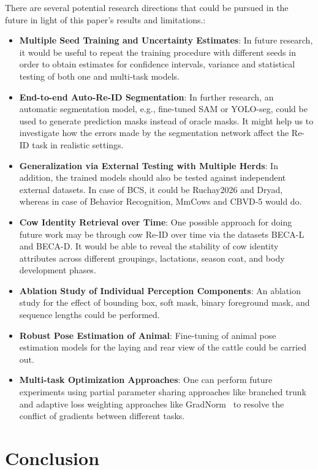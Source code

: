 There are several potential research directions that could be pursued in the future in light of this paper's results and limitations.:
\begin{itemize}
    \item \textbf{Multiple Seed Training and Uncertainty Estimates}: In future research, it would be useful to repeat the training procedure with different seeds in order to obtain estimates for confidence intervals, variance and statistical testing of both one and multi-task models.
    \item \textbf{End-to-end Auto-Re-ID Segmentation}: In further research, an automatic segmentation model, e.g., fine-tuned SAM or YOLO-seg, could be used to generate prediction masks instead of oracle masks. It might help us to investigate how the errors made by the segmentation network affect the Re-ID task in realistic settings.
    \item \textbf{Generalization via External Testing with Multiple Herds}: In addition, the trained models should also be tested against independent external datasets. In case of BCS, it could be Ruchay2026 and Dryad, whereas in case of Behavior Recognition, MmCows and CBVD-5 would do.
    \item \textbf{Cow Identity Retrieval over Time}: One possible approach for doing future work may be through cow Re-ID over time via the datasets BECA-L and BECA-D. It would be able to reveal the stability of cow identity attributes across different groupings, lactations, season coat, and body development phases.
    \item \textbf{Ablation Study of Individual Perception Components}: An ablation study for the effect of bounding box, soft mask, binary foreground mask, and sequence lengths could be performed.
    \item \textbf{Robust Pose Estimation of Animal}: Fine-tuning of animal pose estimation models for the laying and rear view of the cattle could be carried out.
    \item \textbf{Multi-task Optimization Approaches}: One can perform future experiments using partial parameter sharing approaches like branched trunk and adaptive loss weighting approaches like GradNorm~\cite{chen2018gradnorm} to resolve the conflict of gradients between different tasks.
\end{itemize}

\clearpage
\section{Conclusion}

